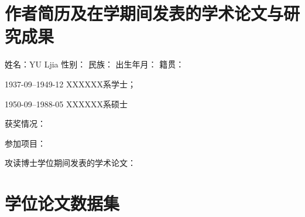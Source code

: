 \documentclass[a4paper,12pt,oneside,openany]{book}
\begin{document}
\chapter*{作者简历及在学期间发表的学术论文与研究成果}

\begin{center}
姓名：YU Ljia 性别：  民族：  出生年月：  籍贯： 
\par\end{center}

\begin{center}
1937-09--1949-12 XXXXXX系学士；
\par\end{center}

\begin{center}
1950-09--1988-05 XXXXXX系硕士
\par\end{center}

\begin{center}
获奖情况：
\par\end{center}

\begin{center}
参加项目：
\par\end{center}

\begin{center}
攻读博士学位期间发表的学术论文：
\par\end{center}


\chapter*{学位论文数据集}
\end{document}
